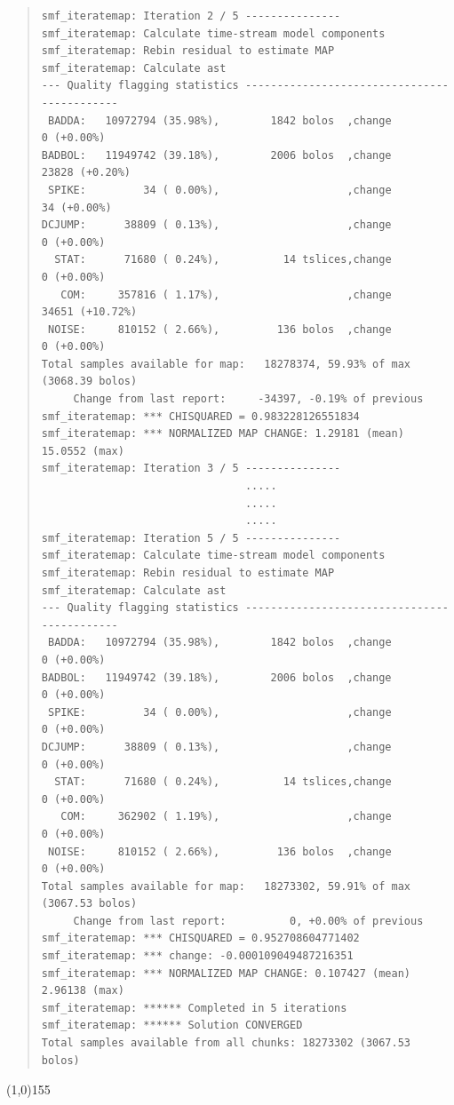 \documentclass[twoside,11pt]{article}
\renewcommand{\_}{\texttt{\symbol{95}}}
\newenvironment{myquote}{\begin{quote}\begin{small}}{\end{small}\end{quote}}
\begin{document}
\begin{myquote}
\begin{verbatim}
smf_iteratemap: Iteration 2 / 5 ---------------                               
smf_iteratemap: Calculate time-stream model components                        
smf_iteratemap: Rebin residual to estimate MAP                                
smf_iteratemap: Calculate ast                                                 
--- Quality flagging statistics --------------------------------------------  
 BADDA:   10972794 (35.98%),        1842 bolos  ,change          0 (+0.00%)   
BADBOL:   11949742 (39.18%),        2006 bolos  ,change      23828 (+0.20%)   
 SPIKE:         34 ( 0.00%),                    ,change         34 (+0.00%)   
DCJUMP:      38809 ( 0.13%),                    ,change          0 (+0.00%)   
  STAT:      71680 ( 0.24%),          14 tslices,change          0 (+0.00%)   
   COM:     357816 ( 1.17%),                    ,change      34651 (+10.72%)  
 NOISE:     810152 ( 2.66%),         136 bolos  ,change          0 (+0.00%)   
Total samples available for map:   18278374, 59.93% of max (3068.39 bolos)    
     Change from last report:     -34397, -0.19% of previous                  
smf_iteratemap: *** CHISQUARED = 0.983228126551834                            
smf_iteratemap: *** NORMALIZED MAP CHANGE: 1.29181 (mean) 15.0552 (max)       
smf_iteratemap: Iteration 3 / 5 ---------------                               
                                .....
                                .....
                                .....
smf_iteratemap: Iteration 5 / 5 ---------------
smf_iteratemap: Calculate time-stream model components
smf_iteratemap: Rebin residual to estimate MAP
smf_iteratemap: Calculate ast
--- Quality flagging statistics --------------------------------------------
 BADDA:   10972794 (35.98%),        1842 bolos  ,change          0 (+0.00%)
BADBOL:   11949742 (39.18%),        2006 bolos  ,change          0 (+0.00%)
 SPIKE:         34 ( 0.00%),                    ,change          0 (+0.00%)
DCJUMP:      38809 ( 0.13%),                    ,change          0 (+0.00%)
  STAT:      71680 ( 0.24%),          14 tslices,change          0 (+0.00%)
   COM:     362902 ( 1.19%),                    ,change          0 (+0.00%)
 NOISE:     810152 ( 2.66%),         136 bolos  ,change          0 (+0.00%)
Total samples available for map:   18273302, 59.91% of max (3067.53 bolos)
     Change from last report:          0, +0.00% of previous
smf_iteratemap: *** CHISQUARED = 0.952708604771402
smf_iteratemap: *** change: -0.000109049487216351
smf_iteratemap: *** NORMALIZED MAP CHANGE: 0.107427 (mean) 2.96138 (max)
smf_iteratemap: ****** Completed in 5 iterations
smf_iteratemap: ****** Solution CONVERGED
Total samples available from all chunks: 18273302 (3067.53 bolos)
\end{verbatim}
\end{myquote}
\vspace{-10mm}
\begin{center}
\line(1,0){155}
\end{center}
\end{document}
